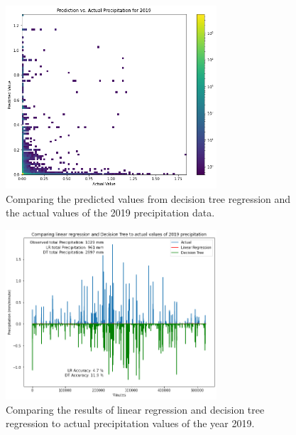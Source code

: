 \documentclass[11pt]{report}
\begin{document}
\begin{figure}[th!]
  \centering
  \includegraphics[width=0.7\textwidth]{Figures/predict_and_actual_2019_precip.png}
  \caption[Comparing ML predicted values to actual precipitation
    values]{\label{DT_compare}Comparing the predicted values from decision tree
    regression and the actual values of the 2019 precipitation data.
  }
\end{figure}
\begin{figure}[bh!]
  \centering
  \includegraphics[width = 0.7\textwidth]{Figures/Comparison.png}
  \caption[Comparing ML results to actual precipitation values]{\label{LR_DT_series}
    Comparing the results of linear regression and decision tree
    regression to actual precipitation values of the year 2019. %
}
\end{figure}
\end{document}
